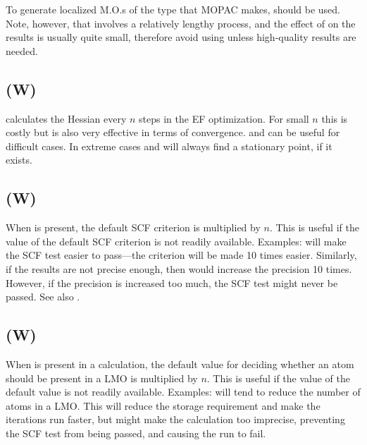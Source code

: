 To generate localized M.O.s of the type that MOPAC makes, 
should be used.  Note, however, that  involves a relatively
lengthy process, and the effect of  on the results
is usually quite small, therefore avoid using  unless
high-quality results are needed.


\subsection*{ (W)}
     calculates  the  Hessian  every  $n$   steps   in   the   EF
   optimization.   For  small $n$ this is costly but is also very effective in
   terms  of  convergence.     and  
can  be  useful  for
   difficult  cases.   In  extreme  cases  and
 will always
   find a stationary point, if it exists.



\subsection*{ (W)}

When  is present, the default SCF criterion is multiplied
by $n$.  This is useful if the value of the default SCF criterion is not
readily available.   Examples:   will make the SCF test
easier to pass---the criterion will be made 10 times easier. Similarly,
if the results are not precise enough, then  would
increase the precision 10 times.  However, if the precision is increased
too much, the SCF test might never be passed.  See also .

\subsection*{ (W)}
When  is present in a  calculation,
the default value for deciding whether
an atom should be present in a LMO is multiplied
by $n$.  This is useful if the value of the default value is not
readily available.   Examples:   will tend to reduce the
number of atoms in a LMO.  This will reduce the storage requirement and
make the iterations run faster, but might make the calculation too
imprecise, preventing the SCF test from being passed, and causing the
run to fail.

